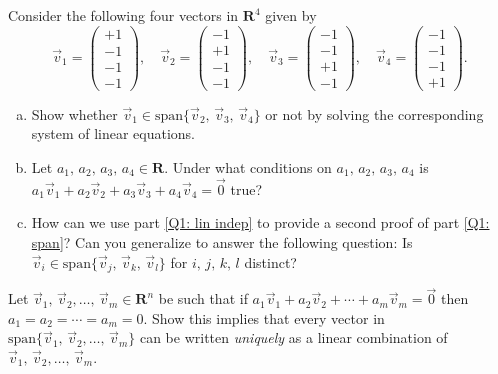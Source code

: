 \documentclass[a4paper,11pt]{article}
\newcommand{\R}{\mathbf{R}}
\begin{document}
 Consider the following four vectors in $\R^4$
given by
\[
  \vec v_1 = \begin{pmatrix}+1 \\ -1 \\ -1 \\ -1\end{pmatrix},  \quad
  \vec v_2 = \begin{pmatrix}-1 \\ +1 \\ -1 \\ -1\end{pmatrix}, \quad
  \vec v_3 = \begin{pmatrix}-1 \\ -1 \\ +1 \\ -1\end{pmatrix}, \quad
  \vec v_4 = \begin{pmatrix}-1 \\ -1 \\ -1 \\ +1\end{pmatrix}.
\]
\begin{enumerate}[(a)]
\item\label{Q1: span} Show whether $\vec v_1 \in \text{span}\{\vec v_2,\,\vec
  v_3,\,\vec v_4\}$ 
  or not by solving the corresponding system of linear equations.
\item\label{Q1: lin indep} Let $a_1,\,a_2,\,a_3,\,a_4 \in \R$. Under what
  conditions on $a_1,\,a_2,\,a_3,\,a_4$ is $a_1\vec v_1+a_2\vec v_2+a_3\vec
  v_3+a_4\vec v_4=\vec{0}$ true?
\item How can we use part \ref{Q1: lin indep} to provide a second proof of part
  \ref{Q1: span}? Can you generalize to answer the following question: Is $\vec
  v_i \in \text{span}\{\vec v_j,\,\vec v_k,\,\vec v_l\}$ for $i,\,j,\,k,\,l$
  distinct? \\
\end{enumerate}

 Let $\vec v_1,\,\vec v_2,\dots,\,\vec v_m \in
\R^n$ be such that if $a_1\vec v_1 + a_2\vec v_2 + \cdots + a_m\vec v_m=\vec 0$
then $a_1=a_2=\cdots=a_m=0$. Show this implies that every vector in
$\text{span}\{\vec v_1,\,\vec v_2,\dots,\,\vec v_m\}$ can be written {\it
  uniquely} as a linear combination of $\vec v_1,\,\vec v_2,\dots,\,\vec v_m$. \\
\end{document}
